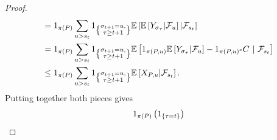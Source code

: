 \begin{proof}
\begin{align*}
{        }
        &=
        1_{
            \pi\left(P\right)
        }
        \sum_{
            u>s_{t}
        }
        1_{
            \left\{
                \substack{
                    \sigma_{t+1}=u,
                    \\
                    \tau\geq t+1
                }
            \right\}
        }
        \mathbb{E}\left[
            \mathbb{E}\left[
                Y_{
                    \sigma_{\tau}
                }
                | \mathcal{F}_{u}
            \right]
            | \mathcal{F}_{s_{t}}
        \right]
        \\
        &=
        1_{
            \pi\left(P\right)
        }
        \sum_{
            u>s_{t}
        }
        1_{
            \left\{
                \substack{
                    \sigma_{t+1}=u,
                    \\
                    \tau\geq t+1
                }
            \right\}
        }
        \mathbb{E}\left[
            1_{
                \pi\left(P,u\right)
            }
            \mathbb{E}\left[
                Y_{
                    \sigma_{\tau}
                }
                | \mathcal{F}_{u}
            \right]
            -
            1_{
                \pi\left(P,u\right)^c
            }
            C
            ~|~ \mathcal{F}_{s_{t}}
        \right]
        \\
        &\leq
        1_{
            \pi\left(P\right)
        }
        \sum_{
            u>s_{t}
        }
        1_{
            \left\{
                \substack{
                    \sigma_{t+1}=u,
                    \\
                    \tau\geq t+1
                }
            \right\}
        }
        \mathbb{E}\left[
            X_{
                P,u
            }
            | \mathcal{F}_{s_{t}}
        \right] .
    \end{align*}  
    Putting together both pieces gives
    \begin{align*}
        &\hspace{0.4cm}
        1_{
            \pi\left(P\right)
        }
        \left(
            1_{
                \left\{\tau=t\right\}
}\right)
\end{align*}
\end{proof}

